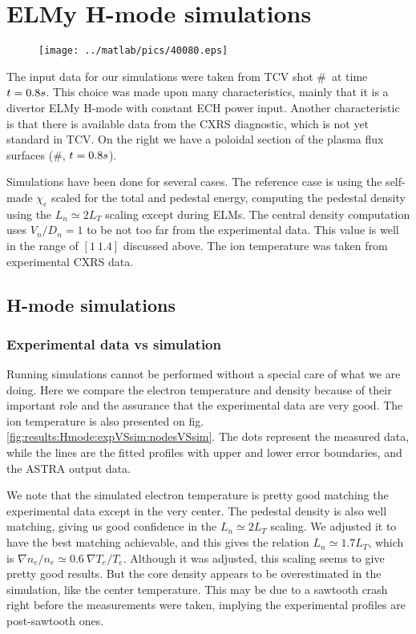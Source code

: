 \chapter{ELMy H-mode simulations}\label{sec:results}\thispagestyle{fancy}
\begin{wrapfigure}{r}{2cm}
\vspace{-0.5cm}
\texttt{[image: ../matlab/pics/40080.eps]}
\vspace{-0.5cm}
\end{wrapfigure}
The input data for our simulations were taken from TCV shot \#\Shot\ at time $t = 0.8 s$. This choice was made upon many characteristics, mainly that it is a divertor ELMy H-mode with constant ECH power input. Another characteristic is that there is available data from the CXRS diagnostic, which is not yet standard in TCV. On the right we have a poloidal section of the plasma flux surfaces (\#\Shot, $t = 0.8 s$).

Simulations have been done for several cases. The reference case is using the self-made $\chi_e$ scaled for the total and pedestal energy, computing the pedestal density using the $L_n \simeq 2 L_T$ scaling except during ELMs. The central density computation uses $V_n / D_n = 1$ to be not too far from the experimental data. This value is well in the range of $[1\ 1.4]$ discussed above. The ion temperature was taken from experimental CXRS data.
\section{H-mode simulations}\label{sec:results:Hmode}
\subsection{Experimental data vs simulation}\label{sec:results:Hmode:expVSsim}
Running simulations cannot be performed without a special care of what we are doing. Here we compare the electron temperature and density because of their important role and the assurance that the experimental data are very good. The ion temperature is also presented on fig. \ref{fig:results:Hmode:expVSsim:nodesVSsim}. The dots represent the measured data, while the lines are the fitted profiles with upper and lower error boundaries, and the ASTRA output data.

We note that the simulated electron temperature is pretty good matching the experimental data except in the very center. The pedestal density is also well matching, giving us good confidence in the $L_n \simeq 2 L_T$ scaling. We adjusted it to have the best matching achievable, and this gives the relation $L_n \simeq 1.7 L_T$, which is $\nabla n_e / n_e \simeq 0.6\ \nabla T_e / T_e$. Although it was adjusted, this scaling seems to give pretty good results. But the core density appears to be overestimated in the simulation, like the center temperature. This may be due to a sawtooth crash right before the measurements were taken, implying the experimental profiles are post-sawtooth ones.

